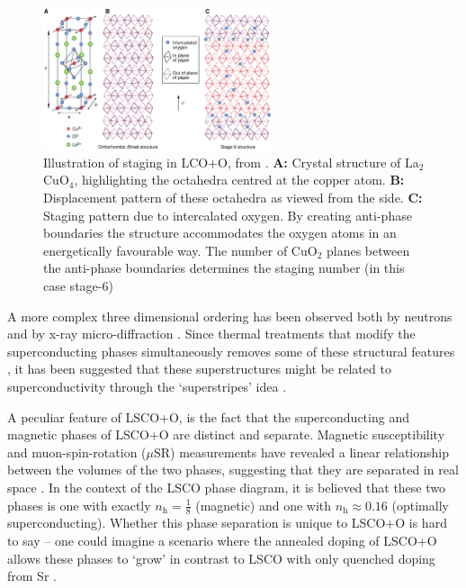 \begin{figure}
    \centering
    \includegraphics[width=0.6\textwidth]{fig/intro/staging.png}
    \caption[staging]{Illustration of staging in LCO+O, from \cite{Wells1997}. \textbf{A:} Crystal structure of La$_2$CuO$_4$, highlighting the octahedra centred at the copper atom. \textbf{B:} Displacement pattern of these octahedra as viewed from the side. \textbf{C:} Staging pattern due to intercalated oxygen. By creating anti-phase boundaries the structure accommodates the oxygen atoms in an energetically favourable way. The number of CuO$_2$ planes between the anti-phase boundaries determines the staging number (in this case stage-6)}
    \label{fig:staging}
\end{figure}

A more complex three dimensional ordering has been observed both by neutrons \cite{Lee2004, ray} and by x-ray micro-diffraction \cite{Fratini2010, Poccia2012}. Since thermal treatments that modify the superconducting phases simultaneously removes some of these structural features \cite{Poccia2012}, it has been suggested that these superstructures might be related to superconductivity through the `superstripes' idea \cite{Bianconi2000}.

A peculiar feature of LSCO+O, is the fact that the superconducting and magnetic phases of LSCO+O are distinct and separate. Magnetic susceptibility and muon-spin-rotation ($\mu$SR) measurements have revealed a linear relationship between the volumes of the two phases, suggesting that they are separated in real space \cite{Mohottala2006,Udby2013}. In the context of the LSCO phase diagram, it is believed that these two phases is one with exactly $n_\text{h} = \frac{1}{8}$ (magnetic) and one with $n_\text{h} \approx 0.16$ (optimally superconducting). Whether this phase separation is unique to LSCO+O is hard to say -- one could imagine a scenario where the annealed doping of LSCO+O allows these phases to `grow' in contrast to LSCO with only quenched doping from Sr \cite{Udby2013 }.

